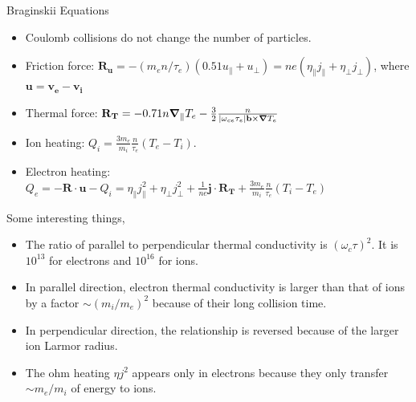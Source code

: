 \begin{frame}{Braginskii Equations}
    \begin{itemize}
        \item Coulomb collisions do not change the number of particles.
        \item Friction force: $\mathbf{R_u} = - (m_en/\tau_e)(0.51u_\parallel + u_\perp) = ne(\eta_\parallel j_\parallel + \eta_\perp j_\perp)$, where $\mathbf{u=v_e-v_i}$
        \item Thermal force: $\mathbf{R_T} = -0.71n\grad_\parallel T_e - \frac{3}{2}\frac{n}{\abs{\omega_{ce}\tau_e}\mathbf{b}\times\grad T_e}$
        \item Ion heating: $Q_i = \frac{3m_e}{m_i}\frac{n}{\tau_e}(T_e-T_i)$.
        \item Electron heating: $Q_e = -\mathbf{R\cdot u} - Q_i = \eta_\parallel j_\parallel^2 + \eta_\perp j_\perp^2 + \frac{1}{ne}\mathbf{j\cdot R_T} + \frac{3m_e}{m_i}\frac{n}{\tau_e}(T_i-T_e)$
    \end{itemize}
    Some interesting things,
    \begin{itemize}
        \item The ratio of parallel to perpendicular thermal conductivity is $(\omega_{c}\tau)^2$. It is $10^{13}$ for electrons and $10^{16}$ for ions.
        \item In parallel direction, electron thermal conductivity is larger than that of ions by a factor $\sim (m_i/m_e)^2$ because of their long collision time.
        \item In perpendicular direction, the relationship is reversed because of the larger ion Larmor radius.
        \item The ohm heating $\eta j^2$ appears only in electrons because they only transfer $\sim m_e/m_i$ of energy to ions.
    \end{itemize}
\end{frame}

